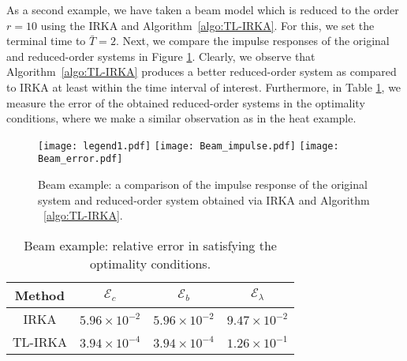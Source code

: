 \documentclass[a4paper,11pt, twoside]{article}
\makeatletter
\newcommand{\cE}{\ensuremath{\mathcal{E}}}
\newcommand{\includetikz}[1]{%
	\tikzsetnextfilename{figure/#1}%
}
\newenvironment{customlegend}[1][]{%
	\begingroup
	\csname pgfplots@init@cleared@structures\endcsname
	\pgfplotsset{#1}%
}{%
	\csname pgfplots@createlegend\endcsname
	\endgroup
}%
\def\addlegendimage{\csname pgfplots@addlegendimage\endcsname}
\newlength\fheight
\newlength\fwidth
\makeatother
\begin{document}
As a second example, we have taken a beam model which is reduced to the order $r = 10$ using the IRKA and Algorithm~\ref{algo:TL-IRKA}. For this, we 
set the terminal time to $\bar T = 2$. Next, we compare the impulse responses of the original and reduced-order systems in Figure 
\ref{fig:beam_impulse}. Clearly, we observe that Algorithm~\ref{algo:TL-IRKA} produces a better reduced-order system as compared to IRKA at least 
within the time interval of interest. Furthermore, in Table \ref{tab:beam_opt}, we measure the error of the obtained reduced-order systems 
in the optimality conditions, where we make a similar observation as in the heat example. 

\begin{figure}[!htb]
	\centering
	\texttt{[image: legend1.pdf]}
	\centering
	\setlength\fheight{3cm}  \setlength\fwidth{5.25cm}
	\texttt{[image: Beam\_impulse.pdf]}  \texttt{[image: Beam\_error.pdf]}
	\caption{Beam example: a comparison of the impulse response of the original system and reduced-order system obtained via IRKA and 
Algorithm ~\ref{algo:TL-IRKA}.}
	\label{fig:beam_impulse}
\end{figure}

	\begin{table}[!bt]
		\centering
		\begin{tabular}{|c|c|c|c|}
			\hline
			Method & $\cE_c$ & $\cE_b$ & $\cE_\lambda$\\ \hline
			IRKA & $5.96\times 10^{-2}$ & $5.96\times 10^{-2}$ & $9.47 \times 10^{-2}$\\ 
			\hline
			TL-IRKA &  $3.94\times 10^{-4}$ & $3.94\times 10^{-4}$ &$1.26\times 10^{-1}$\\
			\hline
		\end{tabular}
			\caption{Beam example: relative error in satisfying the optimality conditions.}
			\label{tab:beam_opt}
	\end{table}
\end{document}
